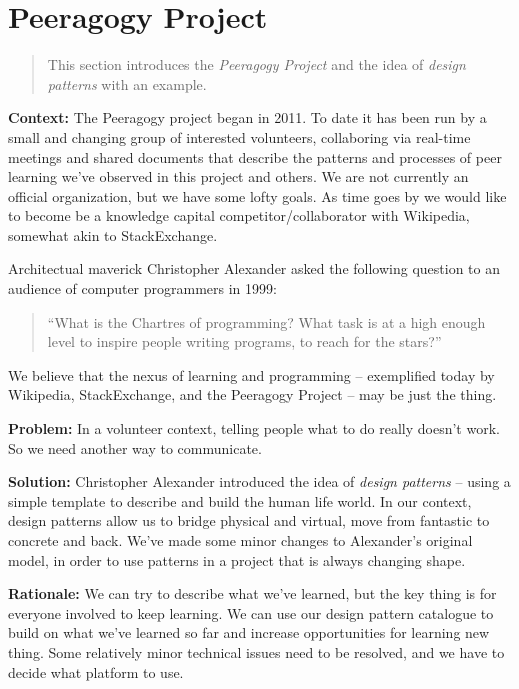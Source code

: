 \section{Peeragogy Project}

\begin{quote}
This section introduces the \emph{Peeragogy Project} and the idea of \emph{design patterns} with an example.
\end{quote}

\textbf{Context:}  The Peeragogy project began in 2011.  To date it has been run by a small and changing group of interested volunteers, collaboring via real-time meetings and shared documents that describe the patterns and processes of peer learning we've observed in this project and others.   We are not currently an official organization, but we have some lofty goals.  As time goes by we would like to become be a knowledge capital competitor/collaborator with Wikipedia, somewhat akin to StackExchange.

Architectual maverick Christopher Alexander asked the following question to an audience of computer programmers in 1999: 
\begin{quote}
``What is the Chartres of programming? What task is at a high enough level to inspire people writing programs, to reach for the stars?''
\end{quote}
We believe that the nexus of learning and programming -- exemplified today by Wikipedia, StackExchange, and the Peeragogy Project -- may be just the thing.

\textbf{Problem:} In a volunteer context, telling people what to do really doesn't work.  So we need another way to communicate.

\textbf{Solution:} Christopher Alexander introduced the idea of \emph{design patterns} -- using a simple template to describe and build the human life world.  In our context, design patterns allow us to bridge physical and virtual, move from fantastic to concrete and back.  We've made some minor changes to Alexander's original model, in order to use patterns in a project that is always changing shape.  

\textbf{Rationale:}
We can try to describe what we've learned, but the key thing is for everyone involved to keep learning. We can use our design pattern catalogue to build on what we've learned so far and increase opportunities for learning new thing.  Some relatively minor technical issues need to be resolved, and we
have to decide what platform to use.

